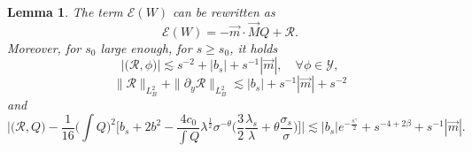 \documentclass[16pt,english, oneside,reqno]{smfart}
\newtheorem{lemma}[theorem]{Lemma}
\begin{document}
\begin{lemma}
    The term $\mathcal{E}(W)$ can be rewritten as
    \begin{equation}\label{equation_rewriting_of_error}
        \mathcal{E}(W) = -\vec{m}\cdot\vec{M}Q + \mathcal{R}.
    \end{equation}
    Moreover, for $s_0$ large enough, for $s \geq s_0$, it holds
    \begin{equation}\label{estimate_on_scalar_prod_R_with_phi}
        \big\lvert \big( \mathcal{R},\phi \big) \big\rvert \lesssim  s^{-2} + |b_s| + s^{-1}|\vec{m}|, \quad \forall \phi \in \mathcal{Y},
    \end{equation}
    \begin{equation}\label{estimate_on_norms_L_2_B_of_R}
        \|\mathcal{R} \|_{L^2_B} + \| \partial_y \mathcal{R}\|_{L^2_B} \lesssim |b_s| + s^{-1}|\vec{m}|+s^{-2}
    \end{equation}
    and
    \begin{equation}\label{estimate_on_scalar_prod_R_Q}
        \bigg\lvert\big( \mathcal{R}, Q\big) -\frac{1}{16}\Big(\int Q\Big)^2\bigg[  b_s+2b^2 - \frac{4c_0}{\int Q}\lambda^{\frac{1}{2}}\sigma^{-\theta}\Big( \frac{3}{2}\frac{\lambda_s}{\lambda} + \theta \frac{\sigma_s}{\sigma}\Big) \bigg] \bigg\rvert \lesssim  |b_s|e^{-\frac{s^{\gamma}}{2}} + s^{-4+2\beta} + s^{-1}|\vec{m}|.
    \end{equation}
\end{lemma}
\end{document}

